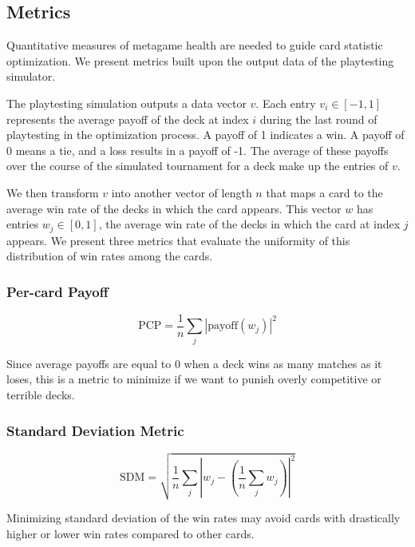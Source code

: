 \subsection{Metrics} \label{sec:metrics}

Quantitative measures of metagame health are needed to guide 
card statistic optimization. We present metrics built upon the
output data of the playtesting simulator.

The playtesting simulation outputs a data vector $v$.
Each entry $v_i \in [-1, 1]$ represents the average payoff of
the deck at index $i$ during the last round of playtesting in
the optimization process. A payoff of 1 indicates a win. A
payoff of 0 means a tie, and a loss results in a payoff of -1.
The average of these payoffs over the course of the simulated
tournament for a deck make up the entries of $v$.

We then transform $v$ into another vector of length $n$ that maps a card to the
average win rate of the decks in which the card appears. This
vector $w$ has entries
$w_j \in [0, 1]$, the average win rate of the decks in which
the card at index $j$ appears. We present three metrics that 
evaluate the uniformity of %
this distribution of win rates among the cards.

\subsubsection{Per-card Payoff}

\begin{equation}
	\mathrm{PCP} = \frac{1}{n} \sum_j \left|\mathrm{payoff}(w_j)\right|^2
\end{equation}

Since average payoffs are equal to 0 when a deck wins as many matches as it loses, this is a metric to 
minimize if we want to punish overly competitive or terrible decks.

\subsubsection{Standard Deviation Metric}

\begin{equation}
	\mathrm{SDM} = \sqrt{\frac{1}{n} \sum_j \left|w_j - \left(\frac{1}{n}\sum_j w_j\right)\right|^2}
\end{equation}

Minimizing standard deviation of the win rates may avoid cards with
drastically higher or lower win rates compared to other cards.


